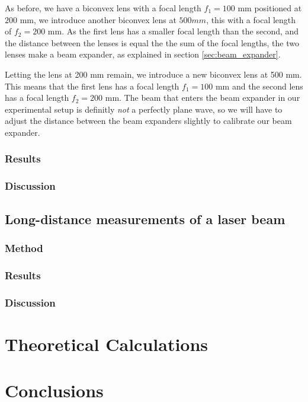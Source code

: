 \documentclass[a4paper, 11pt, notitlepage, english]{article}
\begin{document}
As before, we have a biconvex lens with a focal length $f_1 = 100$ mm positioned at $200$ mm, we introduce another biconvex lens at $500 mm$, this with a focal length of $f_2=200$ mm. As the first lens has a smaller focal length than the second, and the distance between the lenses is equal the the sum of the focal lengths, the two lenses make a beam expander, as explained in section \ref{sec:beam_expander}.

Letting the lens at 200 mm remain, we introduce a new biconvex lens at 500 mm. This means that the first lens has a focal length $f_1=100$ mm and the second lens has a focal length $f_2=200$ mm. The beam that enters the beam expander in our experimental setup is definitly \emph{not} a perfectly plane wave, so we will have to adjust the distance between the beam expanders slightly to calibrate our beam expander.

\subsubsection{Results}
\subsubsection{Discussion}

\subsection{Long-distance measurements of a laser beam}
\subsubsection{Method}
\subsubsection{Results}
\subsubsection{Discussion}

\clearpage

\section{Theoretical Calculations}

\clearpage

\section{Conclusions}
\end{document}
